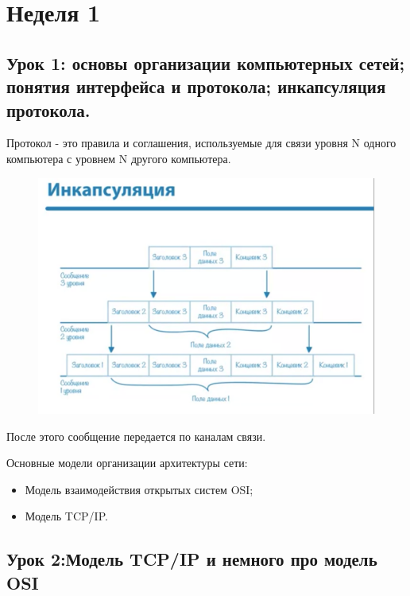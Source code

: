 \documentclass[a4paper,12pt]{article}
\begin{document}
	
	\section{Неделя 1}
	
	\subsection{Урок 1: основы организации компьютерных сетей; понятия интерфейса и протокола; инкапсуляция протокола.}
	
	Протокол - это правила и соглашения, используемые для связи уровня N одного компьютера с уровнем N другого компьютера.
	
	\begin{figure}[h!]
		\begin{center}
			{\includegraphics[scale = 0.4]{1.png}}
			\label{1}
		\end{center}
	\end{figure}

	После этого сообщение передается по каналам связи.
	
	Основные модели организации архитектуры сети:
	
	\begin{itemize}
		\item Модель взаимодействия открытых систем OSI;
		\item Модель TCP/IP.
	\end{itemize}

	\subsection{Урок 2:Модель TCP/IP и немного про модель OSI}
	
\end{document}
